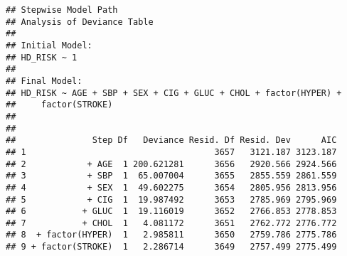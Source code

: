 \documentclass[
]{article}
\newenvironment{Shaded}{\begin{snugshade}}{\end{snugshade}}
\newcommand{\DataTypeTok}[1]{\textcolor[rgb]{0.13,0.29,0.53}{#1}}
\newcommand{\DecValTok}[1]{\textcolor[rgb]{0.00,0.00,0.81}{#1}}
\newcommand{\KeywordTok}[1]{\textcolor[rgb]{0.13,0.29,0.53}{\textbf{#1}}}
\newcommand{\NormalTok}[1]{#1}
\newcommand{\OperatorTok}[1]{\textcolor[rgb]{0.81,0.36,0.00}{\textbf{#1}}}
\newcommand{\OtherTok}[1]{\textcolor[rgb]{0.56,0.35,0.01}{#1}}
\newcommand{\StringTok}[1]{\textcolor[rgb]{0.31,0.60,0.02}{#1}}
\begin{document}
\begin{Shaded}
\end{Shaded}

\begin{verbatim}
## Stepwise Model Path 
## Analysis of Deviance Table
## 
## Initial Model:
## HD_RISK ~ 1
## 
## Final Model:
## HD_RISK ~ AGE + SBP + SEX + CIG + GLUC + CHOL + factor(HYPER) + 
##     factor(STROKE)
## 
## 
##               Step Df   Deviance Resid. Df Resid. Dev      AIC
## 1                                     3657   3121.187 3123.187
## 2            + AGE  1 200.621281      3656   2920.566 2924.566
## 3            + SBP  1  65.007004      3655   2855.559 2861.559
## 4            + SEX  1  49.602275      3654   2805.956 2813.956
## 5            + CIG  1  19.987492      3653   2785.969 2795.969
## 6           + GLUC  1  19.116019      3652   2766.853 2778.853
## 7           + CHOL  1   4.081172      3651   2762.772 2776.772
## 8  + factor(HYPER)  1   2.985811      3650   2759.786 2775.786
## 9 + factor(STROKE)  1   2.286714      3649   2757.499 2775.499
\end{verbatim}
\end{document}
